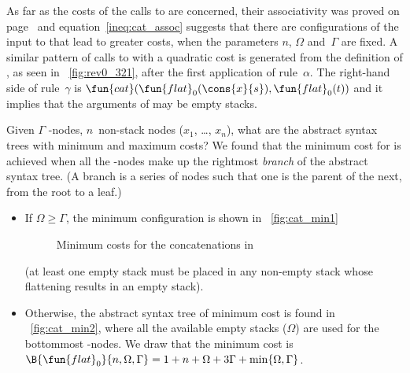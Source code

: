 As far as the costs of the calls to  are concerned, their
associativity was proved on
page~\pageref{proof:assoc_cat} and equation~\eqref{ineq:cat_assoc}
 suggests that there are configurations of
the input to  that
lead to greater costs, when the parameters \(n\), \(\Omega\)
and~\(\Gamma\) are fixed. A similar pattern of calls to
 with a quadratic cost is generated
from the definition of
, as seen in
\fig~\vref{fig:rev0_321}, after the first application of
rule~\(\alpha\). The right\hyp{}hand side of rule~\(\gamma\) is
\(\fun{cat}(\fun{flat}_0(\cons{x}{s}),\fun{flat}_0(t))\)
 and it implies that the arguments of
 may be empty stacks.

Given \(\Gamma\) \hyp{}nodes, \(n\)~non\hyp{}stack nodes
(\(x_1\), \dots, \(x_n\)), what are the abstract syntax trees with
minimum and maximum costs? We found that the minimum cost for
 is achieved when all the
\hyp{}nodes make up the rightmost
\emph{branch} of the abstract syntax tree. (A
branch is a series of nodes such that one is the parent of the next,
from the root to a leaf.)
\begin{itemize}

  \item If \(\Omega \geqslant \Gamma\), the minimum configuration is
  shown in \fig~\ref{fig:cat_min1}
\begin{figure}
\centering
{}
\quad
{}
\caption{Minimum costs for the concatenations in }
\label{fig:cat_min}
\end{figure}
  (at least one empty stack must be placed in any non\hyp{}empty stack
  whose flattening results in an empty stack).

\item Otherwise, the abstract syntax tree of minimum cost is found in
  \fig~\ref{fig:cat_min2}, where all the available empty stacks
  (\(\Omega\)) are used for the bottommost \hyp{}nodes. We
  draw that the minimum cost
  is
  \(\B{\fun{flat}_0}{n,\Omega,\Gamma} = 1 + n + \Omega + 3\Gamma +
  \min\{\Omega,\Gamma\}\).

\end{itemize}

